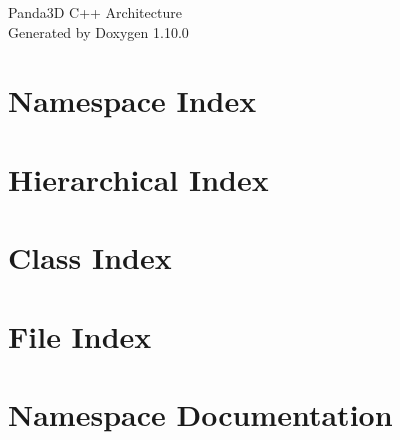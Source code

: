 \documentclass[twoside]{book}
\newcommand{\+}{\discretionary{\mbox{\scriptsize$\hookleftarrow$}}{}{}}
\newcommand{\clearemptydoublepage}{%
    \newpage{\pagestyle{empty}\cleardoublepage}%
  }
\begin{document}
  \raggedbottom
    \hypersetup{pageanchor=false,
                bookmarksnumbered=true,
                pdfencoding=unicode
               }
  \begin{titlepage}
  \vspace*{7cm}
  \begin{center}%
  {\Large Panda3\+D C++ Architecture}\\
  \vspace*{1cm}
  {\large Generated by Doxygen 1.10.0}\\
  \end{center}
  \end{titlepage}
  \clearemptydoublepage
  \tableofcontents
  \clearemptydoublepage
  \hypersetup{pageanchor=true}






\chapter{Namespace Index}

\chapter{Hierarchical Index}

\chapter{Class Index}

\chapter{File Index}

\chapter{Namespace Documentation}



\end{document}

